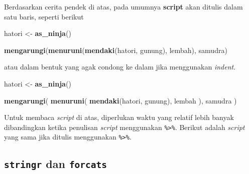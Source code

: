 \documentclass[]{book}
\newenvironment{Shaded}{\begin{snugshade}}{\end{snugshade}}
\newcommand{\KeywordTok}[1]{\textcolor[rgb]{0.13,0.29,0.53}{\textbf{#1}}}
\newcommand{\StringTok}[1]{\textcolor[rgb]{0.31,0.60,0.02}{#1}}
\newcommand{\OperatorTok}[1]{\textcolor[rgb]{0.81,0.36,0.00}{\textbf{#1}}}
\newcommand{\NormalTok}[1]{#1}
\begin{document}
Berdasarkan cerita pendek di atas, pada umumnya \textbf{script} akan
ditulis dalam satu baris, seperti berikut

\begin{Shaded}
\begin{Highlighting}[]
\NormalTok{hatori <-}\StringTok{ }\KeywordTok{as_ninja}\NormalTok{()}

\KeywordTok{mengarungi}\NormalTok{(}\KeywordTok{menuruni}\NormalTok{(}\KeywordTok{mendaki}\NormalTok{(hatori, gunung), lembah), samudra)}
\end{Highlighting}
\end{Shaded}

atau dalam bentuk yang agak condong ke dalam jika menggunakan
\emph{indent}.

\begin{Shaded}
\begin{Highlighting}[]
\NormalTok{hatori <-}\StringTok{ }\KeywordTok{as_ninja}\NormalTok{()}

\KeywordTok{mengarungi}\NormalTok{(}
  \KeywordTok{menuruni}\NormalTok{(}
    \KeywordTok{mendaki}\NormalTok{(hatori, gunung),}
\NormalTok{    lembah}
\NormalTok{  ),}
\NormalTok{  samudra}
\NormalTok{)}
\end{Highlighting}
\end{Shaded}

Untuk membaca \emph{script} di atas, diperlukan waktu yang relatif lebih
banyak dibandingkan ketika penulisan \emph{script} menggunakan
\texttt{\%\textgreater{}\%}. Berikut adalah \emph{script} yang sama jika
ditulis menggunakan \texttt{\%\textgreater{}\%}.

\begin{Shaded}
\end{Shaded}

\subsection{\texorpdfstring{\texttt{stringr} dan
\texttt{forcats}}{stringr dan forcats}}\label{stringr-dan-forcats}
\end{document}
